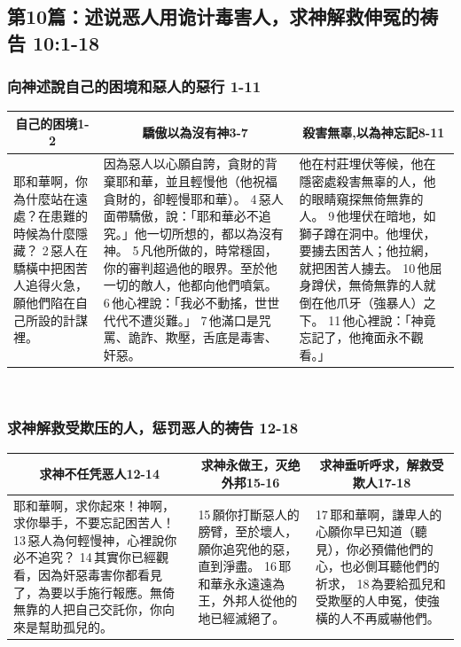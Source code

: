\subsection{第10篇：述说恶人用诡计毒害人，求神解救伸冤的祷告  10:1-18}

\subsubsection{向神述說自己的困境和惡人的惡行 1-11}
\begin{table}[H]
\centering
\begin{tabular}{p{}|p{7.7500cm}|p{6.2500cm}}\hline\hline
\multicolumn{1}{c|}{自己的困境1-2}&\multicolumn{1}{c|}{驕傲以為沒有神3-7}&\multicolumn{1}{c}{殺害無辜,以為神忘記8-11}\\\hline
耶和華啊，你為什麼站在遠處？在患難的時候為什麼隱藏？
2 惡人在驕橫中把困苦人追得火急，願他們陷在自己所設的計謀裡。&因為惡人以心願自誇，貪財的背棄耶和華，並且輕慢他（他祝福貪財的，卻輕慢耶和華）。
4 惡人面帶驕傲，說：「耶和華必不追究。」他一切所想的，都以為沒有神。
5 凡他所做的，時常穩固，你的審判超過他的眼界。至於他一切的敵人，他都向他們噴氣。
6 他心裡說：「我必不動搖，世世代代不遭災難。」
7 他滿口是咒罵、詭詐、欺壓，舌底是毒害、奸惡。
&他在村莊埋伏等候，他在隱密處殺害無辜的人，他的眼睛窺探無倚無靠的人。
9 他埋伏在暗地，如獅子蹲在洞中。他埋伏，要擄去困苦人；他拉網，就把困苦人擄去。
10 他屈身蹲伏，無倚無靠的人就倒在他爪牙（強暴人）之下。
11 他心裡說：「神竟忘記了，他掩面永不觀看。」
\\\hline
\end{tabular}
\end{table} 

\subsubsection{求神解救受欺压的人，惩罚恶人的祷告 12-18}
\begin{table}[H]
\centering
\begin{tabular}{p{7.75cm}|p{4.00cm}|p{5.00cm}}\hline\hline
\multicolumn{1}{c|}{求神不任凭恶人12-14}&\multicolumn{1}{c|}{求神永做王，灭绝外邦15-16}&\multicolumn{1}{c}{求神垂听呼求，解救受欺人17-18}\\\hline
耶和華啊，求你起來！神啊，求你舉手，不要忘記困苦人！
13 惡人為何輕慢神，心裡說你必不追究？
14 其實你已經觀看，因為奸惡毒害你都看見了，為要以手施行報應。無倚無靠的人把自己交託你，你向來是幫助孤兒的。
&15 願你打斷惡人的膀臂，至於壞人，願你追究他的惡，直到淨盡。
16 耶和華永永遠遠為王，外邦人從他的地已經滅絕了。
&17 耶和華啊，謙卑人的心願你早已知道（聽見），你必預備他們的心，也必側耳聽他們的祈求，
18 為要給孤兒和受欺壓的人申冤，使強橫的人不再威嚇他們。\\\hline
\end{tabular}
\end{table} 



